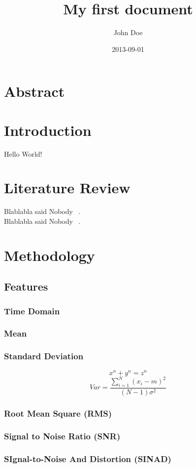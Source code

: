 \documentclass{article}
\title{My first document}
\date{2013-09-01}
\author{John Doe}
\begin{document}
  \maketitle
  \newpage
  \tableofcontents
  \newpage
  \section{Abstract}
  
  
  \newpage
  \section{Introduction}
  Hello World!

  \newpage  
  \section{Literature Review}
  Blablabla said Nobody ~\cite{caesarendra2017review}.\\
  Blablabla said Nobody ~\cite{soualhi2021novel}.

  \newpage  
  \section{Methodology}
  \subsection{Features}
  \subsubsection{Time Domain}
  \subsubsection{Mean}
  \subsubsection{Standard Deviation}  
  \[ x^n + y^n = z^n \]
  $$ Var =\frac{\sum^N_{i=1}(x_i-m)^2}{(N-1)\sigma^2} $$
  \subsubsection{Root Mean Square (RMS)}  
  \subsubsection{Signal to Noise Ratio (SNR)} 
  \subsubsection{SIgnal-to-Noise And Distortion (SINAD)} 
\end{document}
